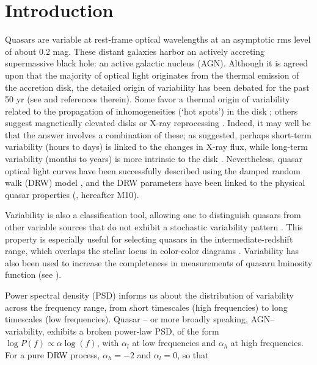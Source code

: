 \documentclass[twocolumn]{aastex62}
\begin{document}
\section{Introduction}

Quasars are variable at rest-frame optical wavelengths at an asymptotic rms level of about 0.2 mag. These distant galaxies harbor an actively accreting supermassive black hole: an active galactic nucleus (AGN). Although it is agreed upon that the majority of optical light originates from the thermal emission of the accretion disk, the detailed origin of variability has been debated for the past 50 yr (see \citealt{sun2018} and references therein). Some favor a thermal origin of variability \citep{kelly2013} related to the propagation of inhomogeneities (`hot spots') in the disk \citep{dexter2011, cai2016}; others suggest magnetically elevated disks \citep{dexter2019} or X-ray reprocessing  \citep{kubota2018}.  Indeed, it may well be that the answer involves a combination of these; as \cite{sanchez2018} suggested, perhaps short-term variability (hours to days) is linked to the changes in X-ray flux, while long-term variability (months to years) is more intrinsic to the disk \citep{edelson2015,lira2015}. Nevertheless, quasar optical light curves have been successfully described using the damped random walk (DRW) model \citep{kelly2009, macleod2010, kozlowski2010, zu2011, kasliwal2015a}, and the DRW parameters have been linked to the physical quasar properties (\citealt{macleod2010}, hereafter M10). 

Variability is also a classification tool, allowing one to distinguish quasars from other variable sources that do not exhibit a stochastic variability pattern \citep{macleod2011}. This property is especially useful for selecting quasars in the intermediate-redshift range, which overlaps the stellar locus in color-color diagrams \citep{sesar2007, yang2017}. Variability has also been used to increase the completeness in measurements of quasaru lminosity function (see \citealt{mcgreer2013, mcgreer2018, palanque2013, ross2013, alsayyad2016}). 

Power spectral density (PSD) informs us about the distribution of variability across the frequency range, from short timescales (high frequencies) to long timescales (low frequencies). Quasar -- or more broadly speaking, AGN-- variability, exhibits a broken power-law PSD, of the form 
$\log{P(f)} \propto \alpha \log{(f)}$, with $\alpha_l$ at low frequencies and $\alpha_h$ at high frequencies. For a pure DRW process,  $\alpha_{h}{=}-2$ and $\alpha_{l}{=}0$, so that
\end{document}
